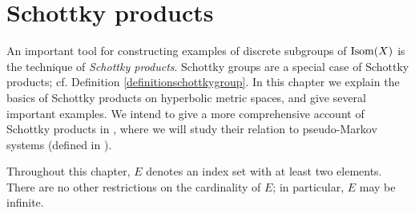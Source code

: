 %
%

\chapter{Schottky products} \label{sectionschottky}


An important tool for constructing examples of discrete subgroups of $\operatorname{Isom}(X)$ is the technique of \emph{Schottky products}. Schottky groups are a special case of Schottky products; cf. Definition \ref{definitionschottkygroup}. In this chapter we explain the basics of Schottky products on hyperbolic metric spaces, and give several important examples. We intend to give a more comprehensive account of Schottky products in \cite{DSU2}, where we will study their relation to pseudo-Markov systems (defined in \cite{StratmannUrbanski3}).

\begin{remark}
Throughout this chapter, $E$ denotes an index set with at least two elements. There are no other restrictions on the cardinality of $E$; in particular, $E$ may be infinite.
\end{remark}

